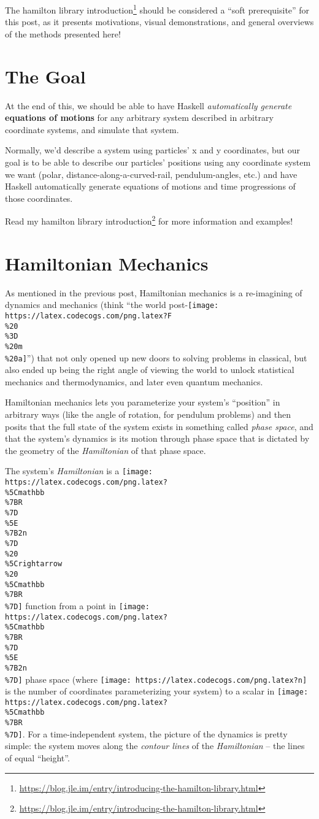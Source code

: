 \documentclass[]{article}
\renewcommand{\href}[2]{#2\footnote{\url{#1}}}
\begin{document}
The
\href{https://blog.jle.im/entry/introducing-the-hamilton-library.html}{hamilton
library introduction} should be considered a ``soft prerequisite'' for this
post, as it presents motivations, visual demonstrations, and general overviews
of the methods presented here!

\section{The Goal}\label{the-goal}

At the end of this, we should be able to have Haskell \emph{automatically
generate} \textbf{equations of motions} for any arbitrary system described in
arbitrary coordinate systems, and simulate that system.

Normally, we'd describe a system using particles' x and y coordinates, but our
goal is to be able to describe our particles' positions using any coordinate
system we want (polar, distance-along-a-curved-rail, pendulum-angles, etc.) and
have Haskell automatically generate equations of motions and time progressions
of those coordinates.

Read \href{https://blog.jle.im/entry/introducing-the-hamilton-library.html}{my
hamilton library introduction} for more information and examples!

\section{Hamiltonian Mechanics}\label{hamiltonian-mechanics}

As mentioned in the previous post, Hamiltonian mechanics is a re-imagining of
dynamics and mechanics (think ``the world
post-\texttt{[image: https://latex.codecogs.com/png.latex?F\\\%20\\\%3D\\\%20m\\\%20a]}'')
that not only opened up new doors to solving problems in classical, but also
ended up being the right angle of viewing the world to unlock statistical
mechanics and thermodynamics, and later even quantum mechanics.

Hamiltonian mechanics lets you parameterize your system's ``position'' in
arbitrary ways (like the angle of rotation, for pendulum problems) and then
posits that the full state of the system exists in something called \emph{phase
space}, and that the system's dynamics is its motion through phase space that is
dictated by the geometry of the \emph{Hamiltonian} of that phase space.

The system's \emph{Hamiltonian} is a
\texttt{[image: https://latex.codecogs.com/png.latex?\\\%5Cmathbb\\\%7BR\\\%7D\\\%5E\\\%7B2n\\\%7D\\\%20\\\%5Crightarrow\\\%20\\\%5Cmathbb\\\%7BR\\\%7D]}
function from a point in
\texttt{[image: https://latex.codecogs.com/png.latex?\\\%5Cmathbb\\\%7BR\\\%7D\\\%5E\\\%7B2n\\\%7D]}
phase space (where \texttt{[image: https://latex.codecogs.com/png.latex?n]} is
the number of coordinates parameterizing your system) to a scalar in
\texttt{[image: https://latex.codecogs.com/png.latex?\\\%5Cmathbb\\\%7BR\\\%7D]}. For
a time-independent system, the picture of the dynamics is pretty simple: the
system moves along the \emph{contour lines} of the \emph{Hamiltonian} -- the
lines of equal ``height''.
\end{document}
